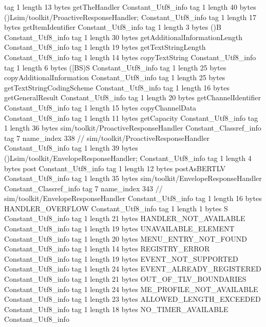 {{{			tag	1
			length	13
			bytes	getTheHandler
		}
		Constant_Utf8_info {
			tag	1
			length	40
			bytes	()Lsim/toolkit/ProactiveResponseHandler;
		}
		Constant_Utf8_info {
			tag	1
			length	17
			bytes	getItemIdentifier
		}
		Constant_Utf8_info {
			tag	1
			length	3
			bytes	()B
		}
		Constant_Utf8_info {
			tag	1
			length	30
			bytes	getAdditionalInformationLength
		}
		Constant_Utf8_info {
			tag	1
			length	19
			bytes	getTextStringLength
		}
		Constant_Utf8_info {
			tag	1
			length	14
			bytes	copyTextString
		}
		Constant_Utf8_info {
			tag	1
			length	6
			bytes	([BS)S
		}
		Constant_Utf8_info {
			tag	1
			length	25
			bytes	copyAdditionalInformation
		}
		Constant_Utf8_info {
			tag	1
			length	25
			bytes	getTextStringCodingScheme
		}
		Constant_Utf8_info {
			tag	1
			length	16
			bytes	getGeneralResult
		}
		Constant_Utf8_info {
			tag	1
			length	20
			bytes	getChannelIdentifier
		}
		Constant_Utf8_info {
			tag	1
			length	15
			bytes	copyChannelData
		}
		Constant_Utf8_info {
			tag	1
			length	11
			bytes	getCapacity
		}
		Constant_Utf8_info {
			tag	1
			length	36
			bytes	sim/toolkit/ProactiveResponseHandler
		}
		Constant_Classref_info {
			tag	7
			name_index	338		// sim/toolkit/ProactiveResponseHandler
		}
		Constant_Utf8_info {
			tag	1
			length	39
			bytes	()Lsim/toolkit/EnvelopeResponseHandler;
		}
		Constant_Utf8_info {
			tag	1
			length	4
			bytes	post
		}
		Constant_Utf8_info {
			tag	1
			length	12
			bytes	postAsBERTLV
		}
		Constant_Utf8_info {
			tag	1
			length	35
			bytes	sim/toolkit/EnvelopeResponseHandler
		}
		Constant_Classref_info {
			tag	7
			name_index	343		// sim/toolkit/EnvelopeResponseHandler
		}
		Constant_Utf8_info {
			tag	1
			length	16
			bytes	HANDLER_OVERFLOW
		}
		Constant_Utf8_info {
			tag	1
			length	1
			bytes	S
		}
		Constant_Utf8_info {
			tag	1
			length	21
			bytes	HANDLER_NOT_AVAILABLE
		}
		Constant_Utf8_info {
			tag	1
			length	19
			bytes	UNAVAILABLE_ELEMENT
		}
		Constant_Utf8_info {
			tag	1
			length	20
			bytes	MENU_ENTRY_NOT_FOUND
		}
		Constant_Utf8_info {
			tag	1
			length	14
			bytes	REGISTRY_ERROR
		}
		Constant_Utf8_info {
			tag	1
			length	19
			bytes	EVENT_NOT_SUPPORTED
		}
		Constant_Utf8_info {
			tag	1
			length	24
			bytes	EVENT_ALREADY_REGISTERED
		}
		Constant_Utf8_info {
			tag	1
			length	21
			bytes	OUT_OF_TLV_BOUNDARIES
		}
		Constant_Utf8_info {
			tag	1
			length	24
			bytes	ME_PROFILE_NOT_AVAILABLE
		}
		Constant_Utf8_info {
			tag	1
			length	23
			bytes	ALLOWED_LENGTH_EXCEEDED
		}
		Constant_Utf8_info {
			tag	1
			length	18
			bytes	NO_TIMER_AVAILABLE
		}
		Constant_Utf8_info {
}}}

